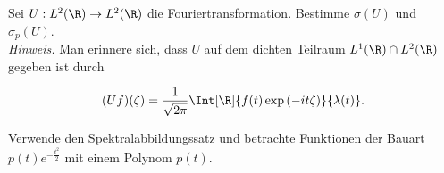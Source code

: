 \begin{exercise}[21/1]

Sei $U: L^2(\R) \to L^2(\R)$ die Fouriertransformation.
Bestimme $\sigma(U)$ und $\sigma_p(U)$. \\

\textit{Hinweis.}
Man erinnere sich, dass $U$ auf dem dichten Teilraum $L^1(\R) \cap L^2(\R)$ gegeben ist durch

\begin{align*}
  (U f)(\zeta)
  =
  \frac{1}{\sqrt{2 \pi}}
  \Int[\R]{f(t) \exp{(-i t \zeta)}}{\lambda(t)}.
\end{align*}

Verwende den Spektralabbildungssatz und betrachte Funktionen der Bauart $p(t) e^{-\frac{t^2}{2}}$ mit einem Polynom $p(t)$.

\end{exercise}


